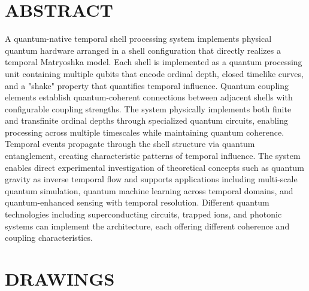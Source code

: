 \documentclass[12pt,letterpaper]{article}
\begin{document}
\newpage
\section*{ABSTRACT}

A quantum-native temporal shell processing system implements physical quantum hardware arranged in a shell configuration that directly realizes a temporal Matryoshka model. Each shell is implemented as a quantum processing unit containing multiple qubits that encode ordinal depth, closed timelike curves, and a "shake" property that quantifies temporal influence. Quantum coupling elements establish quantum-coherent connections between adjacent shells with configurable coupling strengths. The system physically implements both finite and transfinite ordinal depths through specialized quantum circuits, enabling processing across multiple timescales while maintaining quantum coherence. Temporal events propagate through the shell structure via quantum entanglement, creating characteristic patterns of temporal influence. The system enables direct experimental investigation of theoretical concepts such as quantum gravity as inverse temporal flow and supports applications including multi-scale quantum simulation, quantum machine learning across temporal domains, and quantum-enhanced sensing with temporal resolution. Different quantum technologies including superconducting circuits, trapped ions, and photonic systems can implement the architecture, each offering different coherence and coupling characteristics.

\newpage
\section*{DRAWINGS}
\end{document}
